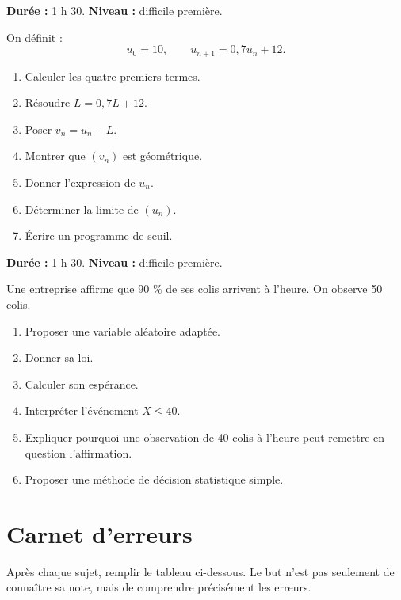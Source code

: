 \documentclass[11pt,a4paper]{article}
\begin{document}
\hypertarget{P-DIFF-02}{}
\begin{difficile}
\textbf{Durée :} 1 h 30.  
\textbf{Niveau :} difficile première.

On définit :
\[
u_0=10,
\qquad
u_{n+1}=0{,}7u_n+12.
\]

\begin{enumerate}
  \item Calculer les quatre premiers termes.
  \item Résoudre $L=0{,}7L+12$.
  \item Poser $v_n=u_n-L$.
  \item Montrer que $(v_n)$ est géométrique.
  \item Donner l'expression de $u_n$.
  \item Déterminer la limite de $(u_n)$.
  \item Écrire un programme de seuil.
\end{enumerate}
\end{difficile}

\hypertarget{P-DIFF-03}{}
\begin{difficile}
\textbf{Durée :} 1 h 30.  
\textbf{Niveau :} difficile première.

Une entreprise affirme que 90 \% de ses colis arrivent à l'heure.  
On observe 50 colis.

\begin{enumerate}
  \item Proposer une variable aléatoire adaptée.
  \item Donner sa loi.
  \item Calculer son espérance.
  \item Interpréter l'événement $X\leq40$.
  \item Expliquer pourquoi une observation de 40 colis à l'heure peut remettre en question l'affirmation.
  \item Proposer une méthode de décision statistique simple.
\end{enumerate}
\end{difficile}

\section{Carnet d'erreurs}

\begin{methode}
Après chaque sujet, remplir le tableau ci-dessous.  
Le but n'est pas seulement de connaître sa note, mais de comprendre précisément les erreurs.
\end{methode}
\end{document}
